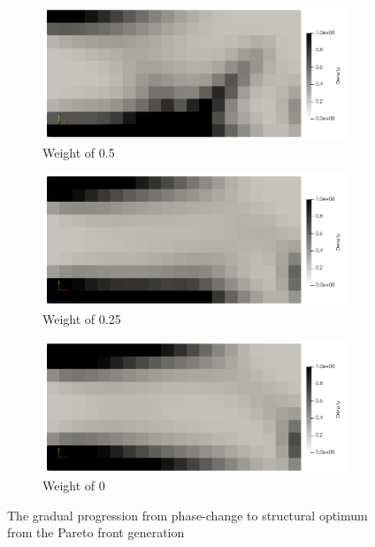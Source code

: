 \begin{figure}[ht]
    \begin{subfigure}[b]{0.45\linewidth}
        \includegraphics[width=\linewidth]{figures/chapter_5/PC_MF_1to1.png}
        \caption{Weight of 0.5}
    \end{subfigure}
    \hfill
    \begin{subfigure}[b]{0.45\linewidth}
        \includegraphics[width=\linewidth]{figures/chapter_5/PC_MF_1to3.png}
        \caption{Weight of 0.25}
    \end{subfigure}
    
    \begin{subfigure}[b]{0.45\linewidth}
        \includegraphics[width=\linewidth]{figures/chapter_5/PC_MF_0to1.png}
        \caption{Weight of 0}
    \end{subfigure}
    \caption{The gradual progression from phase-change to structural optimum from the Pareto front generation}
    \label{fig:multi-functional_pc_progression}
\end{figure}

